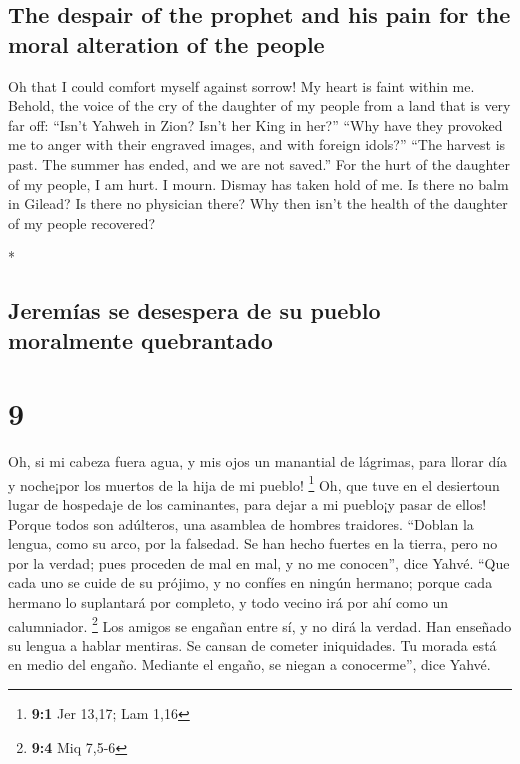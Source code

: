 \begin{paracol}{2}
\begin{otherlanguage}{english}
{\subsection{The despair of the prophet and his pain for the moral
alteration of the
people}\label{the-despair-of-the-prophet-and-his-pain-for-the-moral-alteration-of-the-people}}

 Oh that I could comfort myself against sorrow! My heart
is faint within me.  Behold, the voice of the cry of the
daughter of my people from a land that is very far off: ``Isn't Yahweh
in Zion? Isn't her King in her?'' ``Why have they provoked me to anger
with their engraved images, and with foreign idols?'' 
``The harvest is past. The summer has ended, and we are not saved.''
 For the hurt of the daughter of my people, I am hurt. I
mourn. Dismay has taken hold of me.  Is there no balm in
Gilead? Is there no physician there? Why then isn't the health of the
daughter of my people recovered?

\end{otherlanguage}

\switchcolumn[0]*

\hypertarget{jeremuxedas-se-desespera-de-su-pueblo-moralmente-quebrantado}{%
\subsection{Jeremías se desespera de su pueblo moralmente
quebrantado}\label{jeremuxedas-se-desespera-de-su-pueblo-moralmente-quebrantado}}

\hypertarget{section-16}{%
\section{9}\label{section-16}}

 Oh, si mi cabeza fuera agua, y mis ojos un manantial de
lágrimas, para llorar día y noche¡por los muertos de la hija de mi
pueblo! \footnote{\textbf{9:1} Jer 13,17; Lam 1,16}  Oh,
que tuve en el desiertoun lugar de hospedaje de los caminantes, para
dejar a mi pueblo¡y pasar de ellos! Porque todos son adúlteros, una
asamblea de hombres traidores.  ``Doblan la lengua, como
su arco, por la falsedad. Se han hecho fuertes en la tierra, pero no por
la verdad; pues proceden de mal en mal, y no me conocen'', dice Yahvé.
 ``Que cada uno se cuide de su prójimo, y no confíes en
ningún hermano; porque cada hermano lo suplantará por completo, y todo
vecino irá por ahí como un calumniador. \footnote{\textbf{9:4} Miq 7,5-6}
 Los amigos se engañan entre sí, y no dirá la verdad. Han
enseñado su lengua a hablar mentiras. Se cansan de cometer iniquidades.
 Tu morada está en medio del engaño. Mediante el engaño,
se niegan a conocerme'', dice Yahvé.


\end{paracol}

